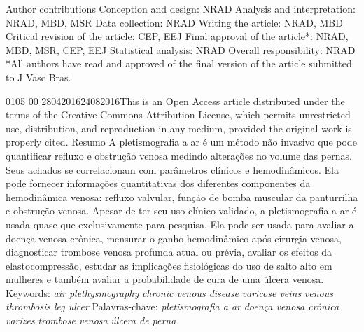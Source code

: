\documentclass[numberinsection,times,10pt,spreadimages]{memoir}
\begin{document}
\begin{multicols}{2}
Author contributions Conception and design: NRAD Analysis and interpretation:
NRAD, MBD, MSR Data collection: NRAD Writing the article: NRAD, MBD Critical
revision of the article: CEP, EEJ Final approval of the article*: NRAD, MBD,
MSR, CEP, EEJ Statistical analysis: NRAD Overall responsibility: NRAD *All
authors have read and approved of the final version of the article submitted
to J Vasc Bras.
\date{2017}{01}{05}
\newcommand{\volume}{00}
00\newcommand{\fpage}{000}
\newcommand{\lpage}{000}
2804201624082016This is an Open Access article distributed under the terms of
the
Creative Commons Attribution License, which permits unrestricted use,
distribution, and reproduction in any medium, provided the original work is
properly cited.
Resumo
A pletismografia a ar é um método não invasivo que pode quantificar refluxo e
obstrução venosa medindo alterações no volume das pernas. Seus achados se
correlacionam com parâmetros clínicos e hemodinâmicos. Ela pode fornecer
informações quantitativas dos diferentes componentes da hemodinâmica venosa:
refluxo valvular, função de bomba muscular da panturrilha e obstrução venosa.
Apesar de ter seu uso clínico validado, a pletismografia a ar é usada quase que
exclusivamente para pesquisa. Ela pode ser usada para avaliar a doença venosa
crônica, mensurar o ganho hemodinâmico após cirurgia venosa, diagnosticar
trombose venosa profunda atual ou prévia, avaliar os efeitos da
elastocompressão, estudar as implicações fisiológicas do uso de salto alto em
mulheres e também avaliar a probabilidade de cura de uma úlcera venosa.
Keywords: \textit{air plethysmography}
\textit{chronic venous disease}
\textit{varicose veins}
\textit{venous thrombosis}
\textit{leg ulcer}
Palavras-chave: \textit{pletismografia a ar}
\textit{doença venosa crônica}
\textit{varizes}
\textit{trombose venosa}
\textit{úlcera de perna}


\end{multicols}
\end{document}
